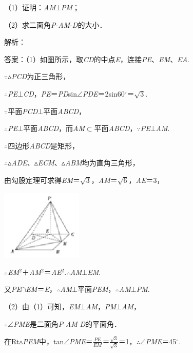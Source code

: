 \documentclass{article} %
\begin{document}
（1）证明：\textit{AM}$\mathrm{\bot}$\textit{PM}；

（2）求二面角\textit{P}-\textit{AM}-\textit{D}的大小．

解析：

答案：（1）如图所示，取\textit{CD}的中点\textit{E}，连接\textit{PE}、\textit{EM}、\textit{EA}.

$\mathrm{\because}$$\mathrm{\vartriangle}$\textit{PCD}为正三角形，

$\mathrm{\therefore}$\textit{PE}$\mathrm{\bot}$\textit{CD}，\textit{PE}＝\textit{PD}sin$\mathrm{\angle}$\textit{PDE}＝2sin60$\mathrm{{}^\circ}$＝$\sqrt{3}$.

$\mathrm{\because}$平面\textit{PCD}$\mathrm{\bot}$平面\textit{ABCD}，

$\mathrm{\therefore}$\textit{PE}$\mathrm{\bot}$平面\textit{ABCD}，而\textit{AM}$\mathrm{\subset }$平面\textit{ABCD}，$\mathrm{\because}$\textit{PE}$\mathrm{\bot}$\textit{AM}.

$\mathrm{\therefore}$四边形\textit{ABCD}是矩形，

$\mathrm{\therefore}$$\mathrm{\vartriangle}$\textit{ADE}、$\mathrm{\vartriangle}$\textit{ECM}、$\mathrm{\vartriangle}$\textit{ABM}均为直角三角形，

由勾股定理可求得\textit{EM}＝$\sqrt{3}$，\textit{AM}＝$\sqrt{6}$，\textit{AE}＝3，

\includegraphics*[width=1.52in, height=1.32in, keepaspectratio=false]{image263}

$\mathrm{\therefore}$\textit{EM}${}^{2}$＋\textit{AM}${}^{2}$＝\textit{AE}${}^{2}$.$\mathrm{\therefore}$\textit{AM}$\mathrm{\bot}$\textit{EM}.

又\textit{PE}$\mathrm{\cap}$\textit{EM}＝\textit{E}，$\mathrm{\therefore}$\textit{AM}$\mathrm{\bot}$平面\textit{PEM}，$\mathrm{\therefore}$\textit{AM}$\mathrm{\bot}$\textit{PM}.

（2）由（1）可知，\textit{EM}$\mathrm{\bot}$\textit{AM}，\textit{PM}$\mathrm{\bot}$\textit{AM}，

$\mathrm{\therefore}$$\mathrm{\angle}$\textit{PME}是二面角\textit{P}-\textit{AM}-\textit{D}的平面角．

在Rt$\mathrm{\vartriangle}$\textit{PEM}中，tan$\mathrm{\angle}$\textit{PME}＝$\frac{PE}{EM}$＝$\frac{\sqrt{3}}{\sqrt{3}}$＝1，$\mathrm{\therefore}$$\mathrm{\angle}$\textit{PME}＝45$\mathrm{{}^\circ}$.
\end{document}
